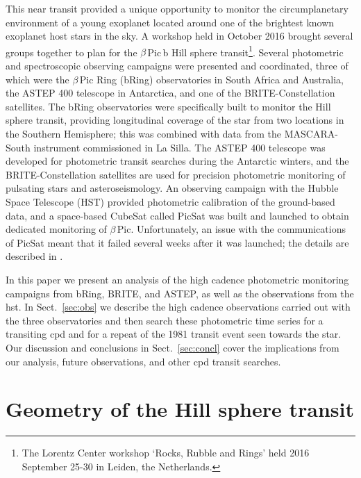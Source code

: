 \documentclass[longauth]{aa} %
\newcommand{\bpb}{$\beta$\,Pic\,b}
\newcommand{\bp}{$\beta$\,Pic}
\begin{document}
This near transit provided a unique opportunity to monitor the circumplanetary environment of a young exoplanet located around one of the brightest known exoplanet host stars in the sky.
%
A workshop held in October 2016 brought several groups together to plan for the \bpb{} Hill sphere transit\footnote{The Lorentz Center workshop `Rocks, Rubble and Rings' held 2016 September 25-30 in Leiden, the Netherlands.}.
%
Several photometric and spectroscopic observing campaigns were presented and coordinated, three of which were the \bp{} Ring (bRing) observatories in South Africa and Australia, the ASTEP 400 telescope in Antarctica, and one of the BRITE-Constellation satellites.
%
The bRing observatories were specifically built to monitor the Hill sphere transit, providing longitudinal coverage of the star from two locations in the Southern Hemisphere; this was combined with data from the MASCARA-South instrument commissioned in La Silla.
%
The ASTEP 400 telescope was developed for photometric transit searches during the Antarctic winters, and the BRITE-Constellation satellites are used for precision photometric monitoring of pulsating stars and asteroseismology.
%
An observing campaign with the Hubble Space Telescope (HST) provided photometric calibration of the ground-based data, and a space-based CubeSat called PicSat \citep{Nowak18} was built and launched to obtain dedicated monitoring of \bp.
%
Unfortunately, an issue with the communications of PicSat meant that it failed several weeks after it was launched; the details are described in \citet{Nowak18}.

In this paper we present an analysis of the high cadence photometric monitoring campaigns from bRing, BRITE, and ASTEP, as well as the observations from the \ac{hst}.
%
In Sect.~\ref{sec:obs} we describe the high cadence observations carried out with the three observatories and then search these photometric time series for a transiting \ac{cpd} and for a repeat of the 1981 transit event seen towards the star.
%
Our discussion and conclusions in Sect.~\ref{sec:concl} cover the implications from our analysis, future observations, and other \ac{cpd} transit searches.




\section{Geometry of the Hill sphere transit }\label{sec:hs}
\end{document}
